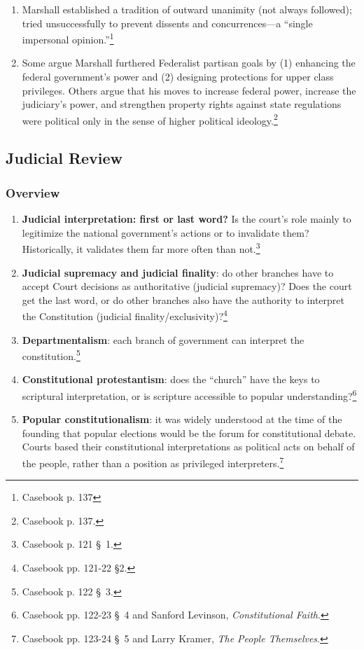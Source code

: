 \begin{enumerate}
    \item Marshall established a tradition of outward unanimity (not always 
    followed); tried unsuccessfully to prevent dissents and concurrences---a 
    ``single impersonal opinion.''\footnote{Casebook p. 137}
    \item Some argue Marshall furthered Federalist partisan goals by (1) 
    enhancing the federal government's power and (2) designing protections for 
    upper class privileges. Others argue that his moves to increase federal 
    power, increase the judiciary's power, and strengthen property rights 
    against state regulations were political only in the sense of higher 
    political ideology.\footnote{Casebook p. 137.}
\end{enumerate}

\subsection{Judicial Review}

\subsubsection{Overview}

\begin{enumerate}
    \item \textbf{Judicial interpretation: first or last word?} Is the court's 
    role mainly to legitimize the national government's actions or to 
    invalidate them? Historically, it validates them far more often than 
    not.\footnote{Casebook p. 121 \S\ 1.}
    \item \textbf{Judicial supremacy and judicial finality}: do other branches 
    have to accept Court decisions as authoritative (judicial supremacy)? Does 
    the court get the last word, or do other branches also have the authority 
    to interpret the Constitution (judicial 
    finality/exclusivity)?\footnote{Casebook pp. 121-22 \S 2.}
    \item \textbf{Departmentalism}: each branch of government can interpret 
    the constitution.\footnote{Casebook p. 122 \S\ 3.}
    \item \textbf{Constitutional protestantism}: does the ``church'' have the 
    keys to scriptural interpretation, or is scripture accessible to popular 
    understanding?\footnote{Casebook pp. 122-23 \S\ 4 and Sanford Levinson, 
    \emph{Constitutional Faith}.}
    \item \textbf{Popular constitutionalism}: it was widely understood at the 
    time of the founding that popular elections would be the forum for 
    constitutional debate. Courts based their constitutional interpretations 
    as political acts on behalf of the people, rather than a position as 
    privileged interpreters.\footnote{Casebook pp. 123-24 \S\ 5 and Larry 
    Kramer, \emph{The People Themselves}.}
\end{enumerate}

